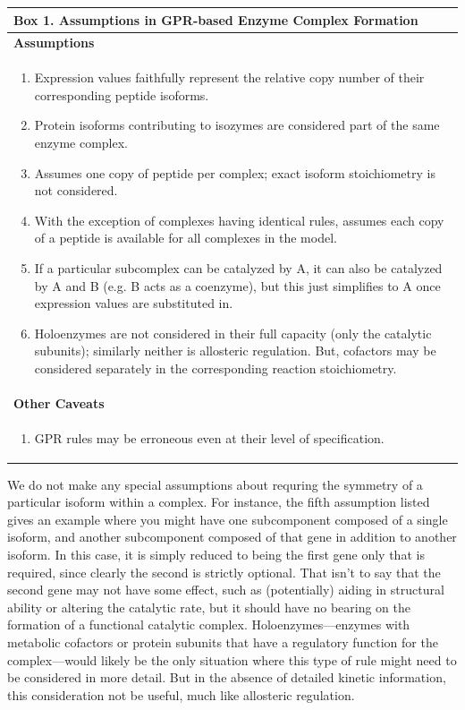 \documentclass[phd,tocprelim]{cornell}
\begin{document}
\begin{center}
\begin{tabular}{| p{14cm} |}
\hline
\textbf{Box 1. Assumptions in GPR-based Enzyme Complex Formation} \\
\hline
\vspace{2.5 mm} 
\textbf{Assumptions} \\
\begin{enumerate}
\item Expression values faithfully represent the relative copy number of their corresponding 
peptide isoforms. 
\item Protein isoforms contributing to isozymes are considered part of the same enzyme complex.
\item Assumes one copy of peptide per complex; exact isoform stoichiometry is not considered. 
\item With the exception of complexes having identical rules, assumes each copy of a peptide 
is available for all complexes in the model.
\item If a particular subcomplex can be catalyzed by A, it can also be catalyzed by A and B (e.g.
B acts as a coenzyme), but this just simplifies to A once expression values are substituted in.
\item Holoenzymes are not considered in their full capacity (only the catalytic subunits); 
similarly neither is allosteric regulation. But, cofactors may be considered separately in 
the corresponding reaction stoichiometry. 
\end{enumerate} \\
\hline
\vspace{2.5 mm} 
\textbf{Other Caveats} \\
\begin{enumerate}
\item GPR rules may be erroneous even at their level of specification.
\end{enumerate} \\
\hline
\end{tabular}
\end{center}

We do not make any special assumptions about requring the symmetry of
a particular isoform within a complex. For instance, the fifth
assumption listed gives an example where you might have one
subcomponent composed of a single isoform, and another subcomponent
composed of that gene in addition to another isoform. In this case, it
is simply reduced to being the first gene only that is required, since
clearly the second is strictly optional. That isn't to say that the
second gene may not have some effect, such as (potentially) aiding in
structural ability or altering the catalytic rate, but it should have
no bearing on the formation of a functional catalytic
complex. Holoenzymes---enzymes with metabolic cofactors or protein
subunits that have a regulatory function for the complex---would
likely be the only situation where this type of rule might need to be
considered in more detail. But in the absence of detailed kinetic
information, this consideration not be useful, much like allosteric
regulation.
\end{document}
